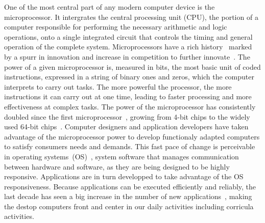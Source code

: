One of the most central part of any modern computer device is the microprocessor.
It intergrates the central processing unit (CPU), the portion of a computer responsible
for performing the necessary arithmetic and logic operations, onto a single integrated 
circuit that controls the timing and general operation of the complete system. 
Microprocessors have a rich history~\cite{PachghareAA2013} marked by a spurr in innovation 
and increase in competition to further innovate~\cite{MarkoffJ1996,GoettlerR2011}. The power of a given microprocessor is, 
measured in bits, the most basic unit of coded instructions, expressed in a string of binary 
ones and zeros, which the computer interprets to carry out tasks. The more powerful the 
processor, the more instructions it can carry out at one time, leading to faster processing 
and more effectiveness at complex tasks. The power of the microprocessor has consistently 
doubled since the first microprocessor~\cite{intel4004}, growing from 4-bit chips to the widely used 
64-bit chips~\cite{BorkarS2011}. Computer designers and application developers have taken advantage of 
the microprocessor power to develop functionaly adapted computers to satisfy consumers 
needs and demands. This fast pace of change is perceivable in operating systems~(OS)~\cite{MaccabeA2006}, 
system software that manages communication between hardware and software, as they are 
being designed to be highly responsive. Applications are in turn developped to take 
advantage of the OS responsiveness. Because applications can be executed efficiently 
and reliably, the last decade has seen a big increase in the number of new applications~\cite{AnttonenM2011}, 
making the destop computers front and center in our daily activities including corricula 
activities.

